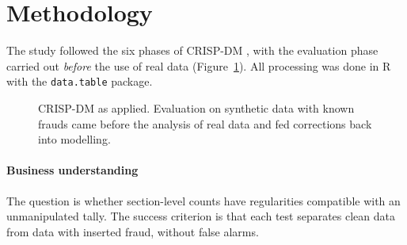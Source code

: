 \documentclass[fleqn,10pt]{SelfArx}
\begin{document}
\section{Methodology}
\label{sec:method}

The study followed the six phases of CRISP-DM \cite{chapman2000,wirth2000},
with the evaluation phase carried out \emph{before} the use of real data
(Figure~\ref{fig:crisp}). All processing was done in R with the
\texttt{data.table} package.

\begin{figure}[ht]
\centering
{}
\caption{CRISP-DM as applied. Evaluation on synthetic data with known
frauds came before the analysis of real data and fed corrections back into
modelling.}
\label{fig:crisp}
\end{figure}

\paragraph{Business understanding} The question is whether section-level
counts have regularities compatible with an unmanipulated tally. The success
criterion is that each test separates clean data from data with inserted
fraud, without false alarms.
\end{document}
